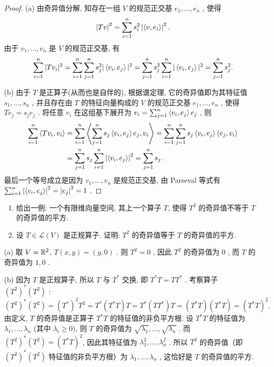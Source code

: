 \documentclass{article}
\begin{document}
\begin{proof}
  (a) 由奇异值分解, 知存在一组 \( V \) 的规范正交基 \( e_1,\dots,e_n \) , 使得 
  \[ \left|Tv\right|^2=\sum_{i=1}^{n}s_i^2 \left|\left\langle v, e_i \right\rangle\right|^2. \]
  由于 \( v_1,\dots,v_n \) 是 \( V \) 的规范正交基, 有
  \[ \sum_{i=1}^n |Tv_i|^2 = \sum_{i=1}^n \sum_{j=1}^n s_j^2 |\left\langle v_i, e_j \right\rangle|^2 = \sum_{j=1}^n s_j^2 \sum_{i=1}^n |\left\langle v_i, e_j \right\rangle|^2 = \sum_{j=1}^n s_j^2. \]

  (b) 由于 \( T \) 是正算子(从而也是自伴的), 根据谱定理, 它的奇异值即为其特征值 \( s_1,\dots,s_n \) , 并且存在由 \( T \) 的特征向量构成的 \( V \) 的规范正交基 \( e_1,\dots,e_n \) , 使得 \( Te_j=s_je_j \) .
  将任意 \( v_i \) 在这组基下展开为 \( v_i = \sum_{j=1}^n \left\langle v_i, e_j \right\rangle e_j \) , 则
  \begin{align*}
    \sum_{i=1}^n \left\langle Tv_i, v_i \right\rangle 
    &= \sum_{i=1}^n \left\langle \sum_{j=1}^n s_j \left\langle v_i, e_j \right\rangle e_j, v_i \right\rangle 
    = \sum_{i=1}^n \sum_{j=1}^n s_j \left\langle v_i, e_j \right\rangle \left\langle e_j, v_i \right\rangle \\
    &= \sum_{j=1}^n s_j \sum_{i=1}^n \left|\left\langle v_i, e_j \right\rangle\right|^2 = \sum_{j=1}^n s_j.
  \end{align*}
  最后一个等号成立是因为 \( v_1,\dots,v_n \) 是规范正交基, 由 Parseval 等式有 \( \sum_{i=1}^n \left|\left\langle v_i, e_j \right\rangle\right|^2 = \left|e_j\right|^2 = 1 \) .
\end{proof}



\begin{problem}[7E-12]
\begin{enumerate}[label=(\alph*)]
\item 给出一例: 一个有限维向量空间, 其上一个算子 $T$, 使得 $T^2$ 的奇异值不等于 $T$ 的奇异值的平方.
\item 设 $T \in \mathcal{L}(V)$ 是正规算子. 证明: $T^2$ 的奇异值等于 $T$ 的奇异值的平方.
\end{enumerate}
\end{problem}

\begin{solution}
  (a) 取 \( V=\mathbb{R}^2 \), \( T(x,y)=(y,0) \) . 则 \( T^2=0 \) , 因此 \( T^2 \) 的奇异值为 \( 0 \) , 而 \( T \) 的奇异值为 \( 1,0 \) .

  (b) 因为 \( T \) 是正规算子, 所以 \( T \) 与 \( T^* \) 交换, 即 \( T^*T = TT^* \) . 
  考察算子 \( (T^2)^*(T^2) \) :
  \[ (T^2)^*(T^2) = (T^*)^2 T^2 = T^* (T^* T) T = T^* (T T^*) T = (T^* T) (T^* T) = (T^*T)^2. \]
  由定义, \( T \) 的奇异值是正算子 \( T^*T \) 的特征值的非负平方根. 设 \( T^*T \) 的特征值为 \( \lambda_1, \dots, \lambda_n \) (其中 \( \lambda_i \ge 0 \)), 则 \( T \) 的奇异值为 \( \sqrt{\lambda_1}, \dots, \sqrt{\lambda_n} \) .
  而 \( (T^2)^*(T^2) = (T^*T)^2 \), 因此其特征值为 \( \lambda_1^2, \dots, \lambda_n^2 \) .
  所以 \( T^2 \) 的奇异值（即 \( (T^2)^*(T^2) \) 特征值的非负平方根）为 \( \lambda_1, \dots, \lambda_n \) , 这恰好是 \( T \) 的奇异值的平方.
\end{solution}
\end{document}

